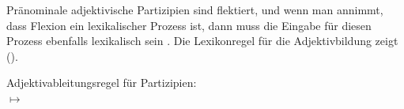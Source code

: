 {Pränominale adjektivische Partizipien sind flektiert, und
wenn man annimmt, dass Flexion ein lexikalischer Prozess ist, dann muss die Eingabe
für diesen Prozess ebenfalls lexikalisch sein \parencites[]{Dowty78a}[]{Bresnan82a}.
%
Die Lexikonregel für die Adjektivbildung zeigt ().

\eas
\label{lr-adjective-formation-da-approach}%
Adjektivableitungsregel für Partizipien:\\[1mm]
%
%
 $\mapsto$\\[7mm]
\hfill{}
\zs

}
